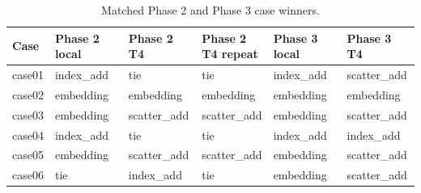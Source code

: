 \begin{table}[!htbp]
\centering
\small
\caption{Matched Phase 2 and Phase 3 case winners.}
\label{tab:phase3-phase2-case-join}
\setlength{\tabcolsep}{3pt}
\renewcommand{\arraystretch}{1.12}
\begin{tabular}{llllll}
\toprule
Case & Phase 2 local & Phase 2 T4 & \shortstack{Phase 2\\T4 repeat} & Phase 3 local & Phase 3 T4 \\
\midrule
case01 & index\_add & tie & tie & index\_add & scatter\_add \\
case02 & embedding & embedding & embedding & embedding & embedding \\
case03 & embedding & scatter\_add & scatter\_add & embedding & scatter\_add \\
case04 & index\_add & tie & tie & index\_add & index\_add \\
case05 & embedding & scatter\_add & scatter\_add & embedding & scatter\_add \\
case06 & tie & index\_add & tie & embedding & scatter\_add \\
\bottomrule
\end{tabular}
\end{table}